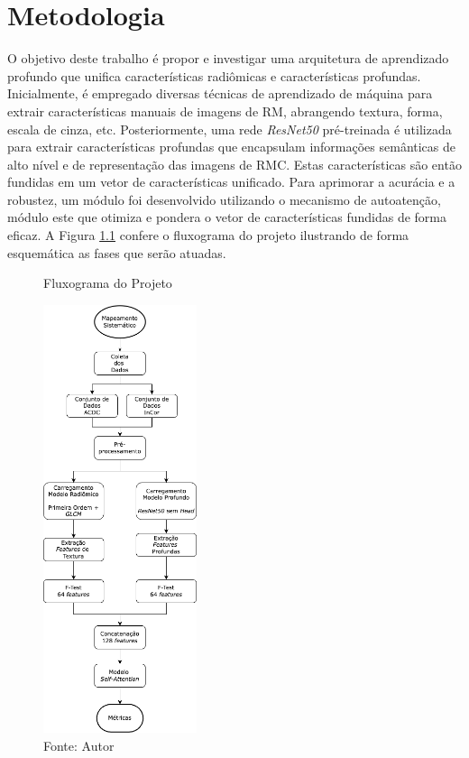 \chapter{Metodologia} 
\label{chap:metodologia}

O objetivo deste trabalho é propor e investigar uma arquitetura de aprendizado profundo que unifica características radiômicas e características profundas. Inicialmente, é empregado diversas técnicas de aprendizado de máquina para extrair características manuais de imagens de RM, abrangendo textura, forma, escala de cinza, etc. Posteriormente, uma rede \textit{ResNet50} pré-treinada é utilizada para extrair características profundas que encapsulam informações semânticas de alto nível e de representação das imagens de \gls{RMC}. Estas características são então fundidas em um vetor de características unificado. Para aprimorar a acurácia e a robustez, um módulo foi desenvolvido utilizando o mecanismo de autoatenção, módulo este que otimiza e pondera o vetor de características fundidas de forma eficaz. A Figura \ref{fig:fig015} confere o fluxograma do projeto ilustrando de forma esquemática as fases que serão atuadas.

\begin{figure}[h!]
    \centering
    \caption{Fluxograma do Projeto}
    \includegraphics[width=0.4\textwidth]{figures/fig015.png}
    \caption*{Fonte: Autor}
    \label{fig:fig015}
\end{figure}

